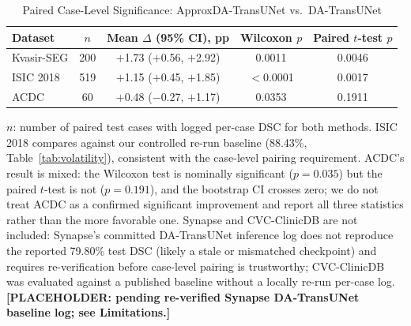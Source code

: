 \begin{table}[ht]
  \caption{Paired Case-Level Significance: ApproxDA-TransUNet vs.\ DA-TransUNet}
  \label{tab:paired_significance}
  \centering
  \setlength{\tabcolsep}{6pt}
  \begin{tabular}{lcccc}
    \toprule
    Dataset & $n$ & Mean $\Delta$ (95\% CI), pp & Wilcoxon $p$ & Paired $t$-test $p$ \\
    \midrule
    Kvasir-SEG & 200 & $+$1.73 ($+$0.56, $+$2.92) & 0.0011 & 0.0046 \\
    ISIC 2018  & 519 & $+$1.15 ($+$0.45, $+$1.85) & $<$0.0001 & 0.0017 \\
    ACDC       & 60  & $+$0.48 ($-$0.27, $+$1.17) & 0.0353 & 0.1911 \\
    \bottomrule
  \end{tabular}
  \par\vspace{5pt}
  \parbox{\textwidth}{\footnotesize $n$: number of paired test cases with logged per-case DSC for both methods. ISIC 2018 compares against our controlled re-run baseline (88.43\%, Table~\ref{tab:volatility}), consistent with the case-level pairing requirement. ACDC's result is mixed: the Wilcoxon test is nominally significant ($p{=}0.035$) but the paired $t$-test is not ($p{=}0.191$), and the bootstrap CI crosses zero; we do not treat ACDC as a confirmed significant improvement and report all three statistics rather than the more favorable one. Synapse and CVC-ClinicDB are not included: Synapse's committed DA-TransUNet inference log does not reproduce the reported 79.80\% test DSC (likely a stale or mismatched checkpoint) and requires re-verification before case-level pairing is trustworthy; CVC-ClinicDB was evaluated against a published baseline without a locally re-run per-case log. \textbf{[PLACEHOLDER: pending re-verified Synapse DA-TransUNet baseline log; see Limitations.]}}
\end{table}


